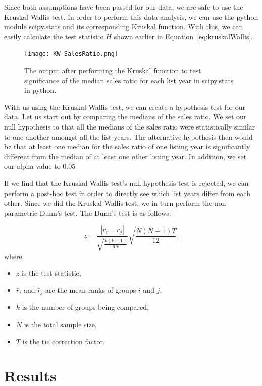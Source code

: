\documentclass[12pt]{article}
\begin{document}
Since both assumptions have been passed for our data, we are safe to use the Kruskal-Wallis test.
In order to perform this data analysis, we can use the python module scipy.stats and its corresponding Kruskal function. With this, we can easily calculate the test statistic $H$ shown earlier in Equation~\ref{eq:kruskalWallis}.

\begin{figure}[!t]
  \centering
  \texttt{[image: KW-SalesRatio.png]}
  \caption{The output after performing the Kruskal function to test significance of the median sales ratio for each list year in scipy.stats in python.}
  \label{fig:KW-SalesRatio}
\end{figure}

With us using the Kruskal-Wallis test, we can create a hypothesis test for our data. Let us start out by comparing the medians of the sales ratio. We set our null hypothesis to that all the medians of the sales ratio were statistically similar to one another amongst all the list years. The alternative hypothesis then would be that at least one median for the sales ratio of one listing year is significantly different from the median of at least one other listing year. In addition, we set our alpha value to 0.05 

If we find that the Kruskal-Wallis test's null hypothesis test is rejected, we can perform a post-hoc test in order to directly see which list years differ from each other. Since we did the Kruskal-Wallis test, we in turn perform the non-parametric Dunn's test. The Dunn's test is as follows:


\begin{equation}
z=\frac{|\bar{r}_i-\bar{r}_j|}{\sqrt{\frac{k(k+1)}{6N}}}\sqrt{\frac{N(N+1)T}{12}}.
\label{eq:dunnTest} 
\end{equation}
where:
\begin{itemize}
\item $z$ is the test statistic,
\item $\bar{r}_i$ and $\bar{r}_j$ are the mean ranks of groups $i$ and $j$,
\item $k$ is the number of groups being compared,
\item $N$ is the total sample size,
\item $T$ is the tie correction factor.
\end{itemize}


\section{Results}
\label{sec:results}
\end{document}
